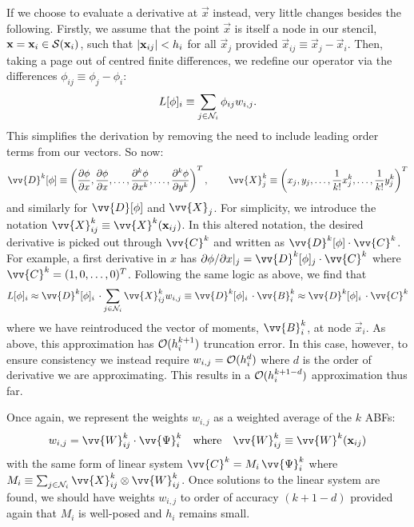 If we choose to evaluate a derivative at $\vec{x}$ instead, very little changes besides the following. Firstly, we assume that the point $\vec{x}$ is itself a node in our stencil, $\mathbf{x} = \mathbf{x}_i \in \mathcal{S}(\mathbf{x}_i)$, such that $\abs{\mathbf{x}_{ij}} < h_i$ for all $\vec{x}_j$ provided $\vec{x}_{ij} \equiv \vec{x}_j - \vec{x}_i$. Then, taking a page out of centred finite differences, we redefine our operator via the differences $\phi_{ij} \equiv \phi_j - \phi_i$:
\begin{equation} \label{eqn:labfm-L}
L[\phi]_i \equiv \sum_{j \in \mathcal{N}_i} \phi_{ij} w_{i, j}.
\end{equation}
This simplifies the derivation by removing the need to include leading order terms from our vectors. So now:
\begin{equation}
\vv{D}^k[\phi] \equiv \left(\pdv{\phi}{x}, \pdv{\phi}{x}, \dots, \pdv[k]{\phi}{x}, \dots, \pdv[k]{\phi}{y} \right)^T,
\qquad
\vv{X}^k_j \equiv \left(x_j, y_j, \dots, \frac{1}{k!} x_j^k, \dots, \frac{1}{k!} y_j^k \right)^T
\end{equation}
and similarly for $\vv{D}[\phi]$ and $\vv{X}_j$. For simplicity, we introduce the notation $\vv{X}^k_{ij} \equiv \vv{X}^k(\vec{x}_{ij})$. In this altered notation, the desired derivative is picked out through $\vv{C}^k$ and written as $\vv{D}^k[\phi] \cdot \vv{C}^k$. For example, a first derivative in $x$ has $\partial \phi / \partial x |_j = \vv{D}^k[\phi]_j \cdot \vv{C}^k$ where $\vv{C}^k = (1, 0, \dots, 0)^T$. Following the same logic as above, we find that
\begin{align}
L[\phi]_i
\approx \vv{D}^k[\phi]_i \, \cdot \sum_{j \in \cl{N}_i} \vv{X}^k_{ij} w_{i, j}
\equiv \vv{D}^k[\phi]_i \, \cdot \vv{B}^k_i \approx \vv{D}^k[\phi]_i \, \cdot \vv{C}^k
\end{align}
where we have reintroduced the vector of moments, $\vv{B}^k_i$, at node $\vec{x}_i$. As above, this approximation has $\mathcal{O}(h_i^{k + 1})$ truncation error. In this case, however, to ensure consistency we instead require $w_{i, j} = \mathcal{O}(h_i^d)$ where $d$ is the order of derivative we are approximating. This results in a $\mathcal{O}(h_i^{k + 1 - d})$ approximation thus far.

Once again, we represent the weights $w_{i, j}$ as a weighted average of the $k$ ABFs:
\begin{equation}
w_{i, j} = \vv{W}^k_{ij} \cdot \vv{\Psi}^k_i
\quad \text{where} \quad
\vv{W}^k_{ij} \equiv \vv{W}^k(\vec{x}_{ij})
\end{equation}
with the same form of linear system $\vv{C}^k = M_i \, \vv{\Psi}^k_i$ where $M_i \equiv \sum_{j \in \cl{N}_i} \vv{X}^k_{ij} \otimes \vv{W}^k_{ij}$. Once solutions to the linear system are found, we should have weights $w_{i, j}$ to order of accuracy $(k + 1 - d)$ provided again that $M_i$ is well-posed and $h_i$ remains small.




